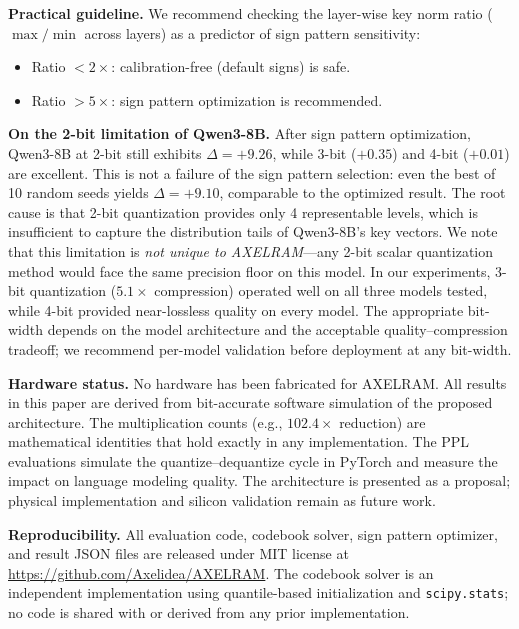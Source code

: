 \documentclass[conference]{IEEEtran}
\begin{document}
\textbf{Practical guideline.}
We recommend checking the layer-wise key norm ratio ($\max / \min$ across layers) as a predictor of sign pattern sensitivity:
\begin{itemize}[nosep]
\item Ratio $< 2\times$: calibration-free (default signs) is safe.
\item Ratio $> 5\times$: sign pattern optimization is recommended.
\end{itemize}

\textbf{On the 2-bit limitation of Qwen3-8B.}
After sign pattern optimization, Qwen3-8B at 2-bit still exhibits $\Delta = +9.26$, while 3-bit ($+0.35$) and 4-bit ($+0.01$) are excellent.
This is not a failure of the sign pattern selection: even the best of 10 random seeds yields $\Delta = +9.10$, comparable to the optimized result.
The root cause is that 2-bit quantization provides only 4 representable levels, which is insufficient to capture the distribution tails of Qwen3-8B's key vectors.
We note that this limitation is \emph{not unique to AXELRAM}---any 2-bit scalar quantization method would face the same precision floor on this model.
In our experiments, 3-bit quantization ($5.1\times$ compression) operated well on all three models tested, while 4-bit provided near-lossless quality on every model.
The appropriate bit-width depends on the model architecture and the acceptable quality--compression tradeoff; we recommend per-model validation before deployment at any bit-width.

\textbf{Hardware status.}
No hardware has been fabricated for AXELRAM.
All results in this paper are derived from bit-accurate software simulation of the proposed architecture.
The multiplication counts (e.g., $102.4\times$ reduction) are mathematical identities that hold exactly in any implementation.
The PPL evaluations simulate the quantize--dequantize cycle in PyTorch and measure the impact on language modeling quality.
The architecture is presented as a proposal; physical implementation and silicon validation remain as future work.

\textbf{Reproducibility.}
All evaluation code, codebook solver, sign pattern optimizer, and result JSON files are released under MIT license at \url{https://github.com/Axelidea/AXELRAM}.
The codebook solver is an independent implementation using quantile-based initialization and \texttt{scipy.stats}; no code is shared with or derived from any prior implementation.

\end{document}
